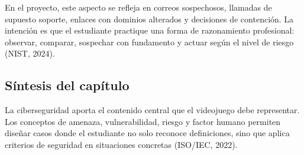 En el proyecto, este aspecto se refleja en correos sospechosos, llamadas de supuesto soporte, enlaces con dominios alterados y decisiones de contención. La intención es que el estudiante practique una forma de razonamiento profesional: observar, comparar, sospechar con fundamento y actuar según el nivel de riesgo (NIST, 2024).

\subsection{Síntesis del capítulo}

La ciberseguridad aporta el contenido central que el videojuego debe representar. Los conceptos de amenaza, vulnerabilidad, riesgo y factor humano permiten diseñar casos donde el estudiante no solo reconoce definiciones, sino que aplica criterios de seguridad en situaciones concretas (ISO/IEC, 2022).

\newpage
